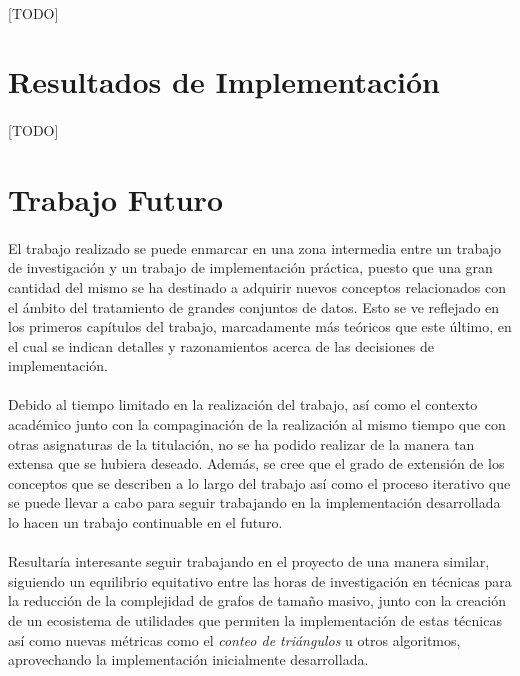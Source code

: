 \documentclass{subfiles}
\begin{document}
      \paragraph{}
      [TODO]

    \section{Resultados de Implementación}
    \label{sec:implementation_results}

      \paragraph{}
      [TODO]

    \section{Trabajo Futuro}
    \label{sec:future_work}

      \paragraph{}
      El trabajo realizado se puede enmarcar en una zona intermedia entre un trabajo de investigación y un trabajo de implementación práctica, puesto que una gran cantidad del mismo se ha destinado a adquirir nuevos conceptos relacionados con el ámbito del tratamiento de grandes conjuntos de datos. Esto se ve reflejado en los primeros capítulos del trabajo, marcadamente más teóricos que este último, en el cual se indican detalles y razonamientos acerca de las decisiones de implementación.

      \paragraph{}
      Debido al tiempo limitado en la realización del trabajo, así como el contexto académico junto con la compaginación de la realización al mismo tiempo que con otras asignaturas de la titulación, no se ha podido realizar de la manera tan extensa que se hubiera deseado. Además, se cree que el grado de extensión de los conceptos que se describen a lo largo del trabajo así como el proceso iterativo que se puede llevar a cabo para seguir trabajando en la implementación desarrollada lo hacen un trabajo continuable en el futuro.

      \paragraph{}
      Resultaría interesante seguir trabajando en el proyecto de una manera similar, siguiendo un equilibrio equitativo entre las horas de investigación en técnicas para la reducción de la complejidad de grafos de tamaño masivo, junto con la creación de un ecosistema de utilidades que permiten la implementación de estas técnicas así como nuevas métricas como el \emph{conteo de triángulos} u otros algoritmos, aprovechando la implementación inicialmente desarrollada.
\end{document}
